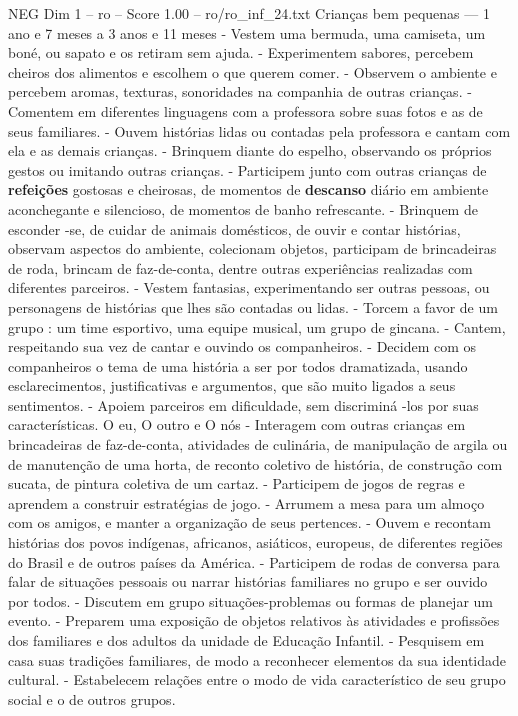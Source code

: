 \begin{textsample}{NEG Dim 1 – ro – Score 1.00 – ro/ro\_inf\_24.txt}  \label{ex:f1_neg_153}
Crianças bem pequenas — 1 ano e 7 meses a 3 anos e 11 meses - Vestem uma bermuda, uma camiseta, um boné, ou sapato e os retiram sem ajuda. - Experimentem sabores, percebem cheiros dos alimentos e escolhem o que querem comer. - Observem o ambiente e percebem aromas, texturas, sonoridades na companhia de outras crianças. - Comentem em diferentes linguagens com a professora sobre suas fotos e as de seus familiares. - Ouvem histórias lidas ou contadas pela professora e cantam com ela e as demais crianças. - Brinquem diante do espelho, observando os próprios gestos ou imitando outras crianças. - Participem junto com outras crianças de \textbf{refeições} gostosas e cheirosas, de momentos de \textbf{descanso} diário em ambiente aconchegante e silencioso, de momentos de banho refrescante. - Brinquem de esconder -se, de cuidar de animais domésticos, de ouvir e contar histórias, observam aspectos do ambiente, colecionam objetos, participam de brincadeiras de roda, brincam de faz-de-conta, dentre outras experiências realizadas com diferentes parceiros. - Vestem fantasias, experimentando ser outras pessoas, ou personagens de histórias que lhes são contadas ou lidas. - Torcem a favor de um grupo : um time esportivo, uma equipe musical, um grupo de gincana. - Cantem, respeitando sua vez de cantar e ouvindo os companheiros. - Decidem com os companheiros o tema de uma história a ser por todos dramatizada, usando esclarecimentos, justificativas e argumentos, que são muito ligados a seus sentimentos. - Apoiem parceiros em dificuldade, sem discriminá -los por suas características.
O eu, O outro e O nós - Interagem com outras crianças em brincadeiras de faz-de-conta, atividades de culinária, de manipulação de argila ou de manutenção de uma horta, de reconto coletivo de história, de construção com sucata, de pintura coletiva de um cartaz. - Participem de jogos de regras e aprendem a construir estratégias de jogo. - Arrumem a mesa para um almoço com os amigos, e manter a organização de seus pertences. - Ouvem e recontam histórias dos povos indígenas, africanos, asiáticos, europeus, de diferentes regiões do Brasil e de outros países da América. - Participem de rodas de conversa para falar de situações pessoais ou narrar histórias familiares no grupo e ser ouvido por todos. - Discutem em grupo situações-problemas ou formas de planejar um evento. - Preparem uma exposição de objetos relativos às atividades e profissões dos familiares e dos adultos da unidade de Educação Infantil. - Pesquisem em casa suas tradições familiares, de modo a reconhecer elementos da sua identidade cultural. - Estabelecem relações entre o modo de vida característico de seu grupo social e o de outros grupos.

\end{textsample}
